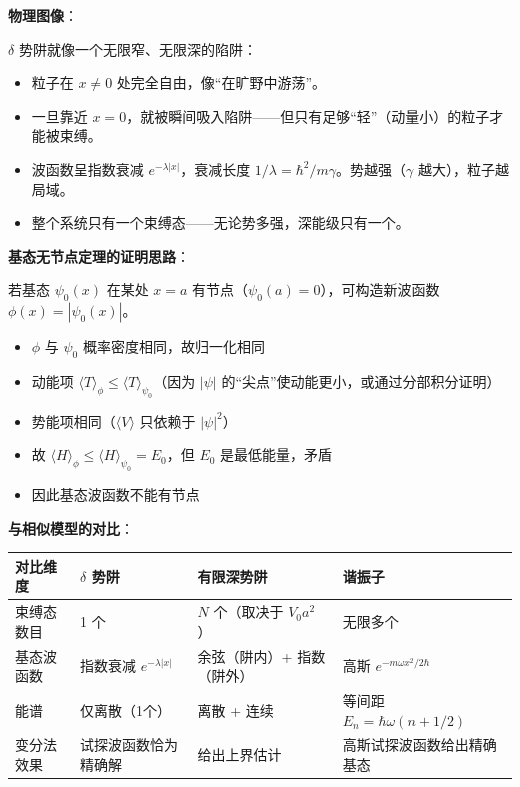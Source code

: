 \begin{insightbox}[物理图像与模型关联]
\textbf{物理图像}：

$\delta$ 势阱就像一个无限窄、无限深的陷阱：
\begin{itemize}[nosep]
    \item 粒子在 $x\neq0$ 处完全自由，像``在旷野中游荡''。
    \item 一旦靠近 $x=0$，就被瞬间吸入陷阱——但只有足够``轻''（动量小）的粒子才能被束缚。
    \item 波函数呈指数衰减 $e^{-\lambda|x|}$，衰减长度 $1/\lambda=\hbar^2/m\gamma$。势越强（$\gamma$ 越大），粒子越局域。
    \item 整个系统只有一个束缚态——无论势多强，深能级只有一个。
\end{itemize}

\textbf{基态无节点定理的证明思路}：

若基态 $\psi_0(x)$ 在某处 $x=a$ 有节点（$\psi_0(a)=0$），可构造新波函数 $\phi(x)=|\psi_0(x)|$。
\begin{itemize}[nosep]
    \item $\phi$ 与 $\psi_0$ 概率密度相同，故归一化相同
    \item 动能项 $\langle T\rangle_\phi\leq\langle T\rangle_{\psi_0}$（因为 $|\psi|$ 的``尖点''使动能更小，或通过分部积分证明）
    \item 势能项相同（$\langle V\rangle$ 只依赖于 $|\psi|^2$）
    \item 故 $\langle H\rangle_\phi\leq\langle H\rangle_{\psi_0}=E_0$，但 $E_0$ 是最低能量，矛盾
    \item 因此基态波函数不能有节点
\end{itemize}

\textbf{与相似模型的对比}：
\begin{center}
\begin{tabular}{llll}
\toprule
\textbf{对比维度} & \textbf{$\delta$ 势阱} & \textbf{有限深势阱} & \textbf{谐振子} \\
\midrule
束缚态数目 & 1 个 & $N$ 个（取决于 $V_0a^2$） & 无限多个 \\
基态波函数 & 指数衰减 $e^{-\lambda|x|}$ & 余弦（阱内）+ 指数（阱外） & 高斯 $e^{-m\omega x^2/2\hbar}$ \\
能谱 & 仅离散（1个） & 离散 + 连续 & 等间距 $E_n=\hbar\omega(n+1/2)$ \\
变分法效果 & 试探波函数恰为精确解 & 给出上界估计 & 高斯试探波函数给出精确基态 \\
\bottomrule
\end{tabular}
\end{center}


\end{insightbox}
